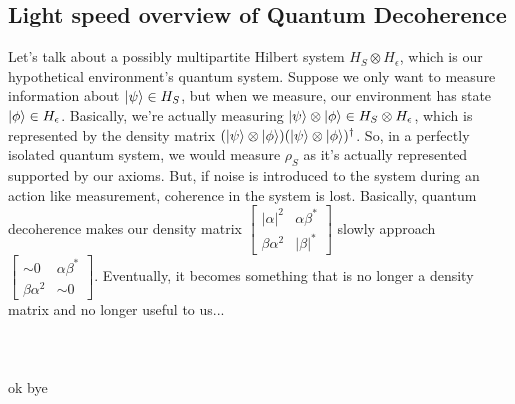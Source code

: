 \documentclass[12pt]{article}
\theoremstyle{plain}
\theoremstyle{nonumberplain}
\theoremstyle{plain}
\theoremstyle{nonumberplain}
\newcommand\1{{\bf 1}}
\newcommand{\bmat}[1]{\begin{bmatrix*} #1 \end{bmatrix*}} %
\newcommand{\<}{\left\langle}
\renewcommand{\>}{\right\rangle}
\newcommand{\abs}[1]{\left\lvert #1 \right\rvert} %
\begin{document}

\subsection{Light speed overview of Quantum Decoherence}
Let's talk about a possibly multipartite Hilbert system $H_S\otimes H_{\epsilon}$, which is our hypothetical environment's quantum system. Suppose we only want to measure information about $\ket{\psi}\in H_S$, but when we measure, our environment has state $\ket{\phi}\in H_{\epsilon}$. Basically, we're actually measuring $\ket{\psi}\otimes\ket{\phi}\in H_S\otimes H_{\epsilon}$, which is represented by the density matrix $(\ket{\psi}\otimes\ket{\phi})(\ket{\psi}\otimes\ket{\phi})^\dagger$. So, in a perfectly isolated quantum system, we would measure $\rho_S$ as it's actually represented supported by our axioms. But, if noise is introduced to the system during an action like measurement, coherence in the system is lost. Basically, quantum decoherence makes our density matrix $\bmat{\abs{\alpha}^2 & \alpha\beta^* \\ \beta\alpha^2 & \abs{\beta}^*}$ slowly approach $\bmat{\sim0 & \alpha\beta^* \\ \beta\alpha^2 & \sim0}$. Eventually, it becomes something that is no longer a density matrix and no longer useful to us...\\\\\\\\ok bye

\end{document}
